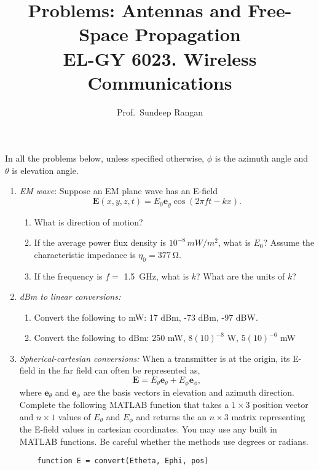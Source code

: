 \documentclass[11pt]{article}
\newcommand{\ebf}{\mathbf{e}}
\newcommand{\Ebf}{\mathbf{E}}
\begin{document}
\title{Problems:  Antennas and Free-Space Propagation\\
EL-GY 6023. Wireless Communications}
\author{Prof.\ Sundeep Rangan}
\date{}

\maketitle

In all the problems below, unless specified otherwise, $\phi$ is the
azimuth angle and $\theta$ is elevation angle.

\begin{enumerate}
\item \emph{EM wave}:  Suppose an EM plane wave has an E-field
\[
    \Ebf(x,y,z,t) = E_0 \ebf_y \cos(2\pi f t - kx).
\]
\begin{enumerate}[label=(\alph*)]
  \item What is direction of motion?
  \item If the average power flux density is $10^{-8}\, \si{mW/m^2}$, what is $E_0$?
   Assume the characteristic impedance is $\eta_0 = \SI{377}{\ohm}$.
  \item If the frequency is $f=$ \SI{1.5}{GHz}, what is $k$?
  What are the units of $k$?
\end{enumerate}

\item \emph{dBm to linear conversions:}
\begin{enumerate}[label=(\alph*)]
\item Convert the following to mW:   17 dBm, -73 dBm, -97 dBW.
\item Convert the following to dBm: 250 mW, $8(10)^{-8}$ W, $5(10)^{-6}$ mW
\end{enumerate}



\item \emph{Spherical-cartesian conversions:}  When a transmitter is at the origin,
its E-field in the far field can often be represented as,
\[
    \Ebf = E_\theta \ebf_\theta + E_\phi \ebf_\phi,
\]
where $\ebf_\theta$ and $\ebf_\phi$ are the basis vectors in elevation and azimuth direction.
Complete the following MATLAB function that takes a $1\times 3$ position vector
 and $n \times 1$ values of $E_\theta$ and $E_\phi$ and returns the
an $n \times 3$ matrix  representing the E-field values in cartesian coordinates.
You may use any built in MATLAB functions.  Be careful whether the methods use degrees
or radians.
\begin{lstlisting}
    function E = convert(Etheta, Ephi, pos)
\end{lstlisting}



\end{enumerate}
\end{document}
